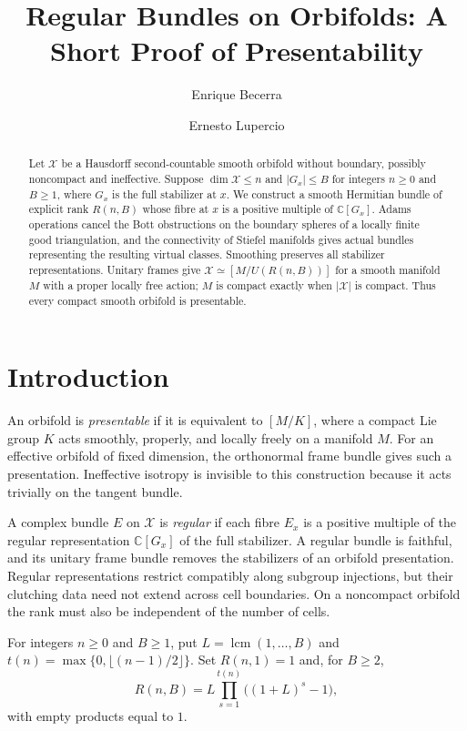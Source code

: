 \documentclass[11pt,a4paper,reqno]{amsart}
\title[Regular bundles on orbifolds]
  {Regular Bundles on Orbifolds: A Short Proof of Presentability}
\author{Enrique Becerra}
\author{Ernesto Lupercio}
\date{}
\numberwithin{equation}{section}
\theoremstyle{remark}
\theoremstyle{plain}
\newcommand{\X}{\mathcal X}
\newcommand{\C}{\mathbb C}
\begin{document}
\begin{abstract}
Let $\X$ be a Hausdorff second-countable smooth orbifold without boundary,
possibly noncompact and ineffective. Suppose $\dim\X\leq n$ and $|G_x|\leq B$
for integers $n\geq0$ and $B\geq1$, where $G_x$ is the full stabilizer at $x$.
We construct a smooth Hermitian bundle of explicit rank $R(n,B)$ whose fibre
at $x$ is a positive multiple of $\C[G_x]$. Adams operations cancel the Bott
obstructions on the boundary spheres of a locally finite good triangulation,
and the connectivity of Stiefel manifolds gives actual bundles representing
the resulting virtual classes.
Smoothing preserves all stabilizer representations. Unitary frames give
$\X\simeq[M/U(R(n,B))]$ for a smooth manifold $M$ with a proper locally free
action; $M$ is compact exactly when $|\X|$ is compact. Thus every compact
smooth orbifold is presentable.
\end{abstract}

\maketitle

\section{Introduction}\label{sec:introduction}

An orbifold is \emph{presentable} if it is equivalent to $[M/K]$, where a
compact Lie group $K$ acts smoothly, properly, and locally freely on a
manifold $M$. For an effective orbifold of fixed dimension, the orthonormal
frame bundle gives such a presentation. Ineffective isotropy is invisible to
this construction because it acts trivially on the tangent bundle.

A complex bundle $E$ on $\X$ is \emph{regular} if each fibre $E_x$ is a
positive multiple of the regular representation $\C[G_x]$ of the full
stabilizer. A regular bundle is faithful, and its unitary frame bundle removes
the stabilizers of an orbifold presentation. Regular representations restrict compatibly along subgroup injections, but
their clutching data need not extend across cell boundaries. On a noncompact
orbifold the rank must also be independent of the number of cells.

For integers $n\geq0$ and $B\geq1$, put
$L=\operatorname{lcm}(1,\ldots,B)$ and
$t(n)=\max\{0,\lfloor(n-1)/2\rfloor\}$. Set $R(n,1)=1$ and, for $B\geq2$,
\begin{equation}\label{eq:rank}
 R(n,B)=L\prod_{s=1}^{t(n)}\bigl((1+L)^s-1\bigr),
\end{equation}
with empty products equal to $1$.
\end{document}

